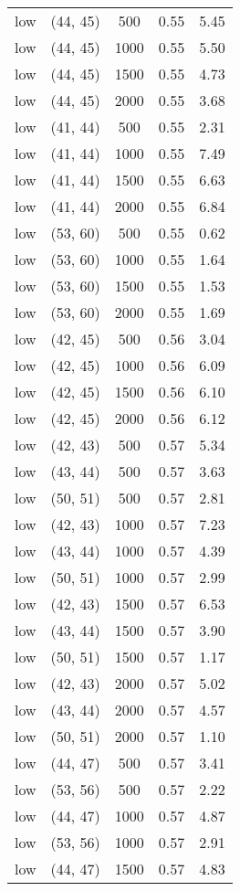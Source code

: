 \begin{tabular}{c c c c c}
low & (44, 45) &  500 & 0.55 & 5.45 \\
low & (44, 45) &  1000 & 0.55 & 5.50 \\
low & (44, 45) &  1500 & 0.55 & 4.73 \\
low & (44, 45) &  2000 & 0.55 & 3.68 \\
low & (41, 44) &  500 & 0.55 & 2.31 \\
low & (41, 44) &  1000 & 0.55 & 7.49 \\
low & (41, 44) &  1500 & 0.55 & 6.63 \\
low & (41, 44) &  2000 & 0.55 & 6.84 \\
low & (53, 60) &  500 & 0.55 & 0.62 \\
low & (53, 60) &  1000 & 0.55 & 1.64 \\
low & (53, 60) &  1500 & 0.55 & 1.53 \\
low & (53, 60) &  2000 & 0.55 & 1.69 \\
low & (42, 45) &  500 & 0.56 & 3.04 \\
low & (42, 45) &  1000 & 0.56 & 6.09 \\
low & (42, 45) &  1500 & 0.56 & 6.10 \\
low & (42, 45) &  2000 & 0.56 & 6.12 \\
low & (42, 43) &  500 & 0.57 & 5.34 \\
low & (43, 44) &  500 & 0.57 & 3.63 \\
low & (50, 51) &  500 & 0.57 & 2.81 \\
low & (42, 43) &  1000 & 0.57 & 7.23 \\
low & (43, 44) &  1000 & 0.57 & 4.39 \\
low & (50, 51) &  1000 & 0.57 & 2.99 \\
low & (42, 43) &  1500 & 0.57 & 6.53 \\
low & (43, 44) &  1500 & 0.57 & 3.90 \\
low & (50, 51) &  1500 & 0.57 & 1.17 \\
low & (42, 43) &  2000 & 0.57 & 5.02 \\
low & (43, 44) &  2000 & 0.57 & 4.57 \\
low & (50, 51) &  2000 & 0.57 & 1.10 \\
low & (44, 47) &  500 & 0.57 & 3.41 \\
low & (53, 56) &  500 & 0.57 & 2.22 \\
low & (44, 47) &  1000 & 0.57 & 4.87 \\
low & (53, 56) &  1000 & 0.57 & 2.91 \\
low & (44, 47) &  1500 & 0.57 & 4.83 \\

\end{tabular}
